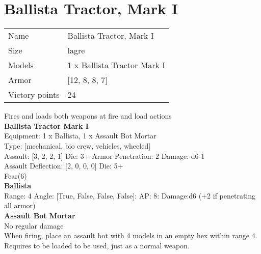 \pagebreak

\section{ Ballista Tractor, Mark I }

\begin{tabular}{ll}
  Name & Ballista Tractor, Mark I \\
  Size & lagre\\
  Models & 1 x Ballista Tractor Mark I\\
  Armor & [12, 8, 8, 7]\\
  Victory points & 24\\
\end{tabular}

Fires and loads both weapons at fire and load actions\\ 


{\bf Ballista Tractor Mark I } \\
Equipment: 1 x Ballista, 1 x Assault Bot Mortar \\
Type: [mechanical, bio crew, vehicles, wheeled] \\

Assault: [3, 2, 2, 1] Die: 3+ Armor Penetration: 2 Damage: d6-1 \\
Assault Deflection: [2, 0, 0, 0] Die: 5+\\
\indent Fear(6)\\ 
 



{\bf Ballista } \\



Range: 4  Angle: [True, False, False, False]: AP: 8: Damage:d6 (+2 if penetrating all armor) \\




{\bf Assault Bot Mortar } \\

No regular damage\\ 
When firing, place an assault bot with 4 models in an empty hex within range 4. Requires to be loaded to be used, just as a normal weapon.\\ 





 





